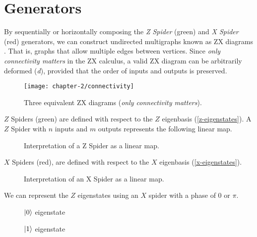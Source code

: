 \section{Generators}

By sequentially or horizontally composing the \textit{Z Spider} (green) and \textit{X Spider} (red) generators, we can construct undirected multigraphs known as ZX diagrams \cite{Wetering2020}. That is, graphs that allow multiple edges between vertices. Since \textit{only connectivity matters} in the ZX calculus, a valid ZX diagram can be arbitrarily deformed (\textit{d}), provided that the order of inputs and outputs is preserved.

\begin{figure}[H]
\centering
    \centering
    \texttt{[image: chapter-2/connectivity]}
    \caption{Three equivalent ZX diagrams (\textit{only connectivity matters}).}
    \label{only-connectivity-matters}
\end{figure}


$Z$ Spiders (green) are defined with respect to the $Z$ eigenbasis (\ref{z-eigenstates}). A $Z$ Spider with $n$ inputs and $m$ outputs represents the following linear map.

\begin{figure}[H]
\centering
{}
\caption{Interpretation of a Z Spider as a linear map.}
\end{figure}

$X$ Spiders (red), are defined with respect to the $X$ eigenbasis (\ref{x-eigenstates}).

\begin{figure}[H]
\centering
{}
\caption{Interpretation of an X Spider as a linear map.}
\end{figure}

We can represent the $Z$ eigenstates using an $X$ spider with a phase of $0$ or $\pi$.

\begin{figure}[H]
\centering
\begin{minipage}{.4\textwidth}
    \centering
    \caption{$\ket 0$ eigenstate}
\end{minipage}%
\begin{minipage}{.4\textwidth}
    \centering
    \caption{$\ket 1$ eigenstate}
    \label{z-eigenstates-zx}
\end{minipage}
\end{figure}


